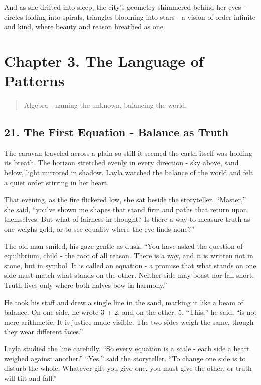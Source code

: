 \documentclass[
  letterpaper,
  DIV=11,
  numbers=noendperiod]{scrreprt}
\begin{document}
And as she drifted into sleep, the city's geometry shimmered behind her
eyes - circles folding into spirals, triangles blooming into stars - a
vision of order infinite and kind, where beauty and reason breathed as
one.

\section{Chapter 3. The Language of
Patterns}\label{chapter-3.-the-language-of-patterns}

\begin{quote}
Algebra - naming the unknown, balancing the world.
\end{quote}

\subsection{21. The First Equation - Balance as
Truth}\label{the-first-equation---balance-as-truth}

The caravan traveled across a plain so still it seemed the earth itself
was holding its breath. The horizon stretched evenly in every direction
- sky above, sand below, light mirrored in shadow. Layla watched the
balance of the world and felt a quiet order stirring in her heart.

That evening, as the fire flickered low, she sat beside the storyteller.
``Master,'' she said, ``you've shown me shapes that stand firm and paths
that return upon themselves. But what of fairness in thought? Is there a
way to measure truth as one weighs gold, or to see equality where the
eye finds none?''

The old man smiled, his gaze gentle as dusk. ``You have asked the
question of equilibrium, child - the root of all reason. There is a way,
and it is written not in stone, but in symbol. It is called an equation
- a promise that what stands on one side must match what stands on the
other. Neither side may boast nor fall short. Truth lives only where
both halves bow in harmony.''

He took his staff and drew a single line in the sand, marking it like a
beam of balance. On one side, he wrote 3 + 2, and on the other, 5.
``This,'' he said, ``is not mere arithmetic. It is justice made visible.
The two sides weigh the same, though they wear different faces.''

Layla studied the line carefully. ``So every equation is a scale - each
side a heart weighed against another.'' ``Yes,'' said the storyteller.
``To change one side is to disturb the whole. Whatever gift you give
one, you must give the other, or truth will tilt and fall.''
\end{document}
